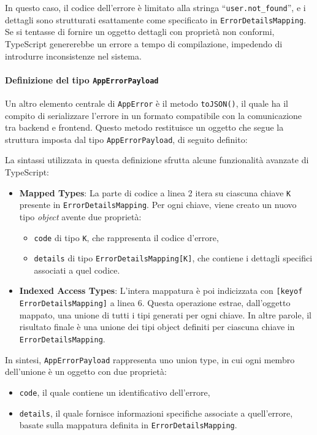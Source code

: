 
%
In questo caso, il codice dell'errore è limitato alla stringa ``\texttt{user.not\_found}'', e i dettagli sono strutturati esattamente come specificato in \texttt{ErrorDetailsMapping}. Se si tentasse di fornire un oggetto dettagli con proprietà non conformi, TypeScript genererebbe un errore a tempo di compilazione, impedendo di introdurre inconsistenze nel sistema.

\paragraph{Definizione del tipo \texttt{AppErrorPayload}}
Un altro elemento centrale di \texttt{AppError} è il metodo \texttt{toJSON()}, il quale ha il compito di serializzare l’errore in un formato compatibile con la comunicazione tra backend e frontend. Questo metodo restituisce un oggetto che segue la struttura imposta dal tipo \texttt{AppErrorPayload}, di seguito definito:


La sintassi utilizzata in questa definizione sfrutta alcune funzionalità avanzate di TypeScript:
\begin{itemize}
  \item \textbf{Mapped Types}: La parte di codice a linea 2 itera su ciascuna chiave \texttt{K} presente in \texttt{ErrorDetailsMapping}. Per ogni chiave, viene creato un nuovo tipo \textit{object} avente due proprietà:
    \begin{itemize}
      \item \texttt{code} di tipo \texttt{K}, che rappresenta il codice d’errore,
      \item \texttt{details} di tipo \texttt{ErrorDetailsMapping[K]}, che contiene i dettagli specifici associati a quel codice.
    \end{itemize}

  \item \textbf{Indexed Access Types}: L'intera mappatura è poi indicizzata con \texttt{[keyof ErrorDetailsMapping]} a linea 6. Questa operazione estrae, dall'oggetto mappato, una unione di tutti i tipi generati per ogni chiave. In altre parole, il risultato finale è una unione dei tipi object definiti per ciascuna chiave in \texttt{ErrorDetailsMapping}.
\end{itemize}
%
In sintesi, \texttt{AppErrorPayload} rappresenta uno union type, in cui ogni membro dell'unione è un oggetto con due proprietà:
\begin{itemize}
  \item \texttt{code}, il quale contiene un identificativo dell'errore,
  \item \texttt{details}, il quale fornisce informazioni specifiche associate a quell'errore, basate sulla mappatura definita in \texttt{ErrorDetailsMapping}.
\end{itemize}

